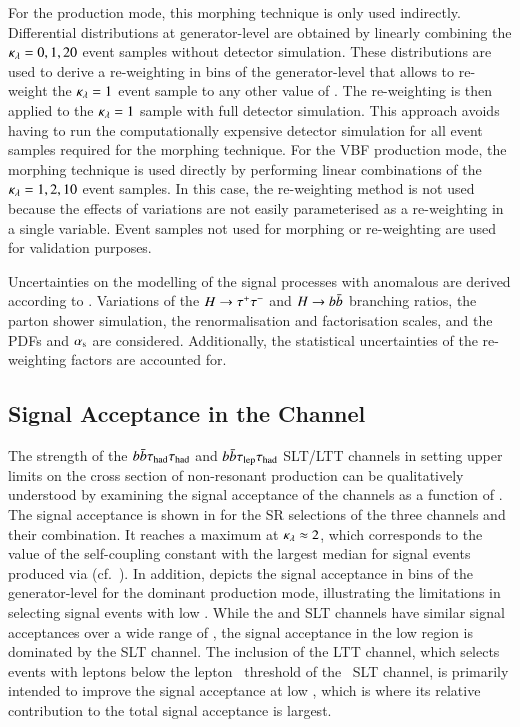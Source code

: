 For the \ggF production mode, this morphing technique is only used
indirectly. Differential distributions at generator-level are obtained
by linearly combining the $\kappa_{\lambda} = 0, 1, 20$ event samples without
detector simulation. These distributions are used to derive a
re-weighting in bins of the generator-level \mHH that allows to
re-weight the $\kappa_{\lambda} = 1$ event sample to any other value of
\klambda. The re-weighting is then applied to the $\kappa_{\lambda} = 1$
sample with full detector simulation. This approach avoids having to
run the computationally expensive detector simulation for all event
samples required for the morphing technique. For the VBF production
mode, the morphing technique is used directly by performing linear
combinations of the $\kappa_{\lambda} = 1, 2, 10$ event samples. In this case,
the re-weighting method is not used because the effects of \klambda
variations are not easily parameterised as a re-weighting in a single
variable. Event samples not used for morphing or re-weighting are used
for validation purposes.

Uncertainties on the modelling of the signal processes with anomalous
\klambda are derived according to .
Variations of the $H \to \tau^{+} \tau^{-}$ and $H \to b\bar{b}$ branching ratios,
the parton shower simulation, the renormalisation and factorisation
scales, and the PDFs and $\alpha_{\text{s}}$ are considered. Additionally, the
statistical uncertainties of the \klambda re-weighting factors are
accounted for.


\subsection{Signal Acceptance in the \bbtautau Channel}%
\label{sec:self_coupling_bbtt_limitations}

The strength of the $b\bar{b}\tau_{\text{had}}\tau_{\text{had}}$ and $b\bar{b}\tau_{\text{lep}}\tau_{\text{had}}$ SLT/LTT channels in
setting upper limits on the cross section of non-resonant \HH production can be
qualitatively understood by examining the signal acceptance of the channels as a
function of \klambda. The signal acceptance is shown in
 for the SR selections of the three
channels and their combination. It reaches a maximum at $\kappa_{\lambda} \approx 2$,
which corresponds to the value of the self-coupling constant with the largest
median \mHH for signal events produced via \ggF
(cf.~). In addition, 
depicts the signal acceptance in bins of the generator-level \mHH for the
dominant \ggF production mode, illustrating the limitations in selecting signal
events with low \mHH. While the \hadhad and \lephad SLT channels have similar
signal acceptances over a wide range of \mHH, the signal acceptance in the low
\mHH region is dominated by the \lephad SLT channel. The inclusion of the
\lephad LTT channel, which selects events with leptons below the lepton
\pT~threshold of the \lephad~SLT channel, is primarily intended to improve the
signal acceptance at low \mHH, which is where its relative contribution to the
total signal acceptance is largest.

